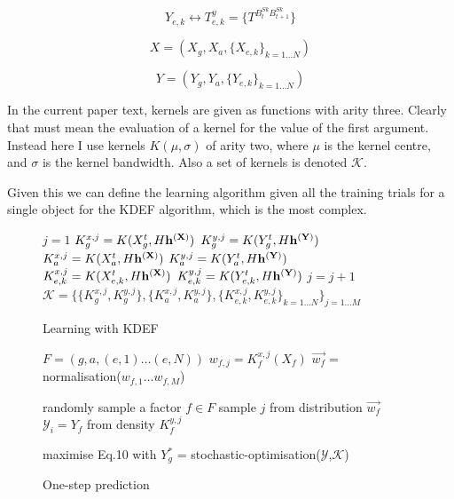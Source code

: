 \documentclass[11pt]{article} %
\begin{document}
\begin{equation}
Y_{e,k} \leftrightarrow T^{y}_{e,k} = \{  T^{B^{Sk}_{t}B^{Sk}_{t+1}}  \}
\end{equation}

\begin{equation}
X = (X_g,X_a,\{X_{e,k}\}_{k=1 \ldots N} )
\end{equation}

\begin{equation}
Y = (Y_g,Y_a,\{Y_{e,k}\}_{k=1 \ldots N} )
\end{equation}

In the current paper text, kernels are given as functions with arity three. Clearly that must mean the evaluation of a kernel for the value of the first argument. Instead here I use kernels $K(\mu,\sigma)$ of arity two, where $\mu$ is the kernel centre, and $\sigma$ is the kernel bandwidth. Also a set of kernels is denoted $\mathcal{K}$.

Given this we can define the learning algorithm given all the training trials for a single object for the KDEF algorithm, which is the most complex.

\begin{figure}
\caption{Learning with KDEF}
\label{alg:learning}
\begin{algorithmic}
\STATE $j=1$
\STATE $K^{x,j}_{g}= K(X^t_{g}, H\bf{h^{(X)}})$
\STATE $K^{y,j}_{g}= K(Y^t_{g}, H\bf{h^{(Y)}})$
\STATE $K^{x,j}_{a}= K(X^t_{a}, H\bf{h^{(X)}})$
\STATE $K^{y,j}_{a}= K(Y^t_{a}, H\bf{h^{(Y)}})$
\STATE $K^{x,j}_{e,k}= K(X^t_{e,k}, H\bf{h^{(X)}})$
\STATE $K^{y,j}_{e,k}= K(Y^t_{e,k}, H\bf{h^{(Y)}})$
\ENDFOR
\STATE $j=j+1$
\ENDFOR
\ENDFOR
\STATE $\mathcal{K} = \{ \{K^{x,j}_g ,  K^{y,j}_g \} , \{K^{x,j}_a ,  K^{y,j}_a \}, \{K^{x,j}_{e,k} ,  K^{y,j}_{e,k} \}_{k=1 \ldots N} \}_{ j = 1 \ldots M}$
\end{algorithmic}
\end{figure}

\begin{figure}
\caption{One-step prediction}
\label{alg:prediction}
\begin{algorithmic}
\STATE $F = (g, a, (e,1) \ldots (e,N))$   
\STATE $w_{f,j} = K^{x,j}_f(X_f)$
\ENDFOR
\STATE $\vec{w_f} =$ normalisation($w_{f,1} \ldots w_{f,M}$)
\ENDFOR

\STATE randomly sample a factor $f\in F$ 
\STATE sample $j$ from distribution $\vec{w_f}$
\STATE  $\mathcal{Y}_i = Y_f$ from density $K^{y,j}_f$
\ENDFOR

\STATE maximise Eq.10 with $Y^*_g$ = stochastic-optimisation($\mathcal{Y}$,$\mathcal{K}$) 
\end{algorithmic}
\end{figure}
\end{document}
